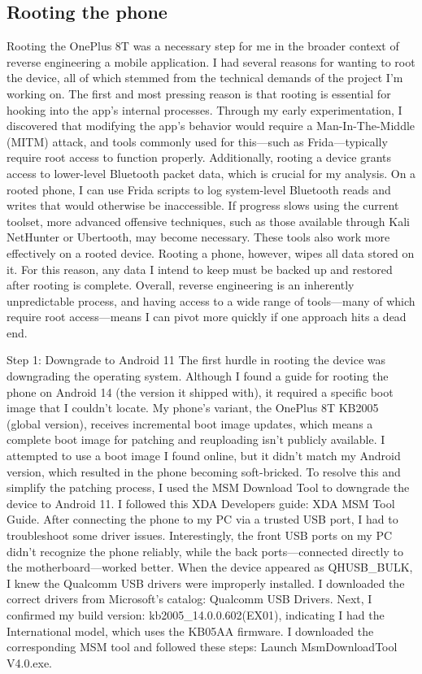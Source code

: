 \subsection{Rooting the phone}
Rooting the OnePlus 8T was a necessary step for me in the broader context of reverse engineering a mobile application. I had several reasons for wanting to root the device, all of which stemmed from the technical demands of the project I’m working on.
The first and most pressing reason is that rooting is essential for hooking into the app's internal processes. Through my early experimentation, I discovered that modifying the app’s behavior would require a Man-In-The-Middle (MITM) attack, and tools commonly used for this—such as Frida—typically require root access to function properly.
Additionally, rooting a device grants access to lower-level Bluetooth packet data, which is crucial for my analysis. On a rooted phone, I can use Frida scripts to log system-level Bluetooth reads and writes that would otherwise be inaccessible. If progress slows using the current toolset, more advanced offensive techniques, such as those available through Kali NetHunter or Ubertooth, may become necessary. These tools also work more effectively on a rooted device.
Rooting a phone, however, wipes all data stored on it. For this reason, any data I intend to keep must be backed up and restored after rooting is complete. Overall, reverse engineering is an inherently unpredictable process, and having access to a wide range of tools—many of which require root access—means I can pivot more quickly if one approach hits a dead end.

Step 1: Downgrade to Android 11
The first hurdle in rooting the device was downgrading the operating system. Although I found a guide for rooting the phone on Android 14 (the version it shipped with), it required a specific boot image that I couldn’t locate. My phone’s variant, the OnePlus 8T KB2005 (global version), receives incremental boot image updates, which means a complete boot image for patching and reuploading isn't publicly available.
I attempted to use a boot image I found online, but it didn’t match my Android version, which resulted in the phone becoming soft-bricked. To resolve this and simplify the patching process, I used the MSM Download Tool to downgrade the device to Android 11. I followed this XDA Developers guide: XDA MSM Tool Guide.
After connecting the phone to my PC via a trusted USB port, I had to troubleshoot some driver issues. Interestingly, the front USB ports on my PC didn’t recognize the phone reliably, while the back ports—connected directly to the motherboard—worked better. When the device appeared as QHUSB_BULK, I knew the Qualcomm USB drivers were improperly installed. I downloaded the correct drivers from Microsoft’s catalog: Qualcomm USB Drivers.
Next, I confirmed my build version: kb2005_14.0.0.602(EX01), indicating I had the International model, which uses the KB05AA firmware. I downloaded the corresponding MSM tool and followed these steps:
Launch MsmDownloadTool V4.0.exe.



